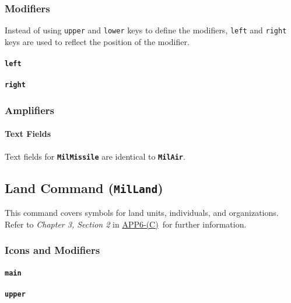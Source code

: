 \documentclass[a4paper, titlepage]{article}
\newcommand\DocLink{\href{https://www.awl.edu.pl/images/en/APP_6_C.pdf}{APP6-(C)}}
\begin{document}
\subsubsection{Modifiers}

Instead of using \texttt{upper} and \texttt{lower} keys to define the modifiers, \texttt{left} and \texttt{right} keys are used to reflect the position of the modifier.

\paragraph{\texttt{left}}\quad


\paragraph{\texttt{right}}\quad


\subsubsection{Amplifiers}

\paragraph{Text Fields}

Text fields for \textbf{\texttt{MilMissile}} are identical to \textbf{\texttt{MilAir}}.

\subsection{Land Command (\textbf{\texttt{MilLand}})}

This command covers symbols for land units, individuals, and organizations. Refer to \textit{Chapter 3, Section 2} in \DocLink\ for further information.

\subsubsection{Icons and Modifiers}

\paragraph{\texttt{main}}\quad


\paragraph{\texttt{upper}}\quad

\end{document}
